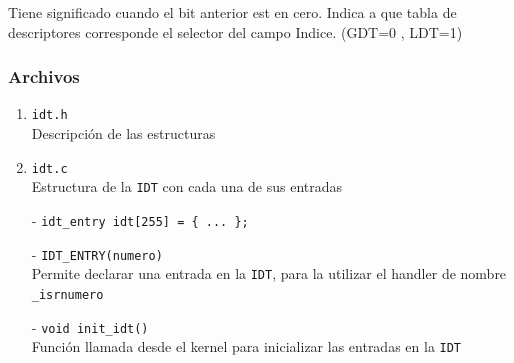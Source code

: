 \documentclass[aspectratio=169]{beamer}
\begin{document}
\begin{frame}
\begin{itemize}
    Tiene significado cuando el bit anterior est en cero. Indica a que tabla de descriptores corresponde el selector del campo Indice. (GDT=0 , LDT=1)
    \end{itemize}
\end{frame}

\begin{frame}[fragile]
    \frametitle{Archivos}
    \begin{enumerate}
    \item \Large \texttt{idt.h}\\ \normalsize Descripción de las estructuras
    \vspace{0.5cm}
    \pause
    \item \Large \texttt{idt.c}\\ \normalsize Estructura de la \texttt{IDT} con cada una de sus entradas
    \end{enumerate}
    \begin{itemize}
    \setlength\itemsep{0.3cm}
    \pause
    \item[-] \verb|idt_entry idt[255] = { ... };|
    \pause
    \item[-] \texttt{IDT\_ENTRY(}\textcolor{verdeuca}{\texttt{numero}}\texttt{)}\\
    Permite declarar una entrada en la \texttt{IDT}, para la utilizar el handler de nombre \textcolor{naranjauca}{\texttt{\_isr}}\textcolor{verdeuca}{\texttt{numero}}
    \pause
    \item[-] \texttt{void init\_idt()}\\ Función llamada desde el kernel para inicializar las entradas en la \texttt{IDT}
    \end{itemize}
\end{frame}
\end{document}
